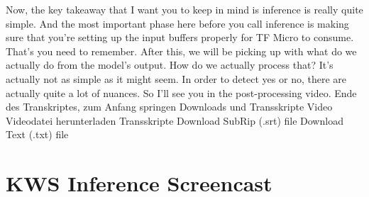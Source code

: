     Now, the key takeaway that I want you to keep in mind
    is inference is really quite simple.
    And the most important phase here before you
    call inference is making sure that you're setting up the input buffers
    properly for TF Micro to consume.
    That's you need to remember.
    After this, we will be picking up with what do
    we actually do from the model's output.
    How do we actually process that?
    It's actually not as simple as it might seem.
    In order to detect yes or no, there are actually quite a lot of nuances.
    So I'll see you in the post-processing video.
    Ende des Transkriptes, zum Anfang springen
    Downloads und Transskripte
    Video
    Videodatei herunterladen
    Transskripte
    Download SubRip (.srt) file
    Download Text (.txt) file     
    
\section{KWS Inference Screencast}


